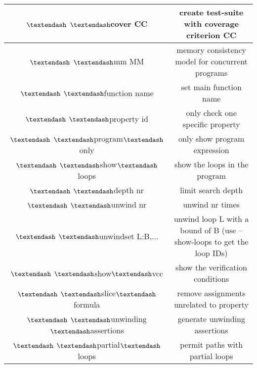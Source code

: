 \begin{center}
\begin{tabular}{|| c | c ||}
\hline
$\textendash$ $\textendash$cover CC                &   create test-suite with coverage criterion CC \\
\hline
$\textendash$ $\textendash$mm MM                   &   memory consistency model for concurrent programs \\
\hline
$\textendash$ $\textendash$function name         &     set main function name \\
\hline
$\textendash$ $\textendash$property id           &     only check one specific property \\
\hline
$\textendash$ $\textendash$program$\textendash$only          &     only show program expression \\
\hline
$\textendash$ $\textendash$show$\textendash$loops            &     show the loops in the program \\
\hline
$\textendash$ $\textendash$depth nr              &     limit search depth \\
\hline
$\textendash$ $\textendash$unwind nr             &     unwind nr times \\
\hline
$\textendash$ $\textendash$unwindset L:B,...     &     unwind loop L with a bound of B
                                                       (use --show-loops to get the loop IDs) \\
\hline                        
$\textendash$ $\textendash$show$\textendash$vcc               &    show the verification conditions \\
\hline
$\textendash$ $\textendash$slice$\textendash$formula         &     remove assignments unrelated to property \\
\hline
$\textendash$ $\textendash$unwinding$\textendash$assertions   &    generate unwinding assertions \\
\hline
$\textendash$ $\textendash$partial$\textendash$loops          &    permit paths with partial loops \\

\hline

\end{tabular}

\end{center}
 